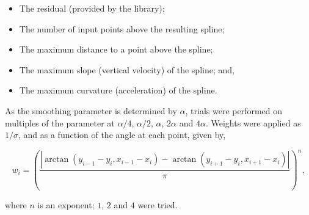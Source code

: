 \documentclass[doc]{apa6}
\begin{document}
\begin{itemize}
\item The residual (provided by the library);
\item The number of input points above the resulting spline;
\item The maximum distance to a point above the spline;
\item The maximum slope (vertical velocity) of the spline; and,
\item The maximum curvature (acceleration) of the spline.
\end{itemize}

As the smoothing parameter is determined by $\alpha$, trials were performed on multiples of the parameter at $\alpha/4$, $\alpha/2$, $\alpha$, $2\alpha$ and $4\alpha$. Weights were applied as $1/\sigma$, and as a function of the angle at each point, given by,

\begin{equation}
w_i = \left( \frac{ 
			|\arctan(y_{i-1}-y_{i}, x_{i-1}-x_{i}) - \arctan(y_{i+1}-y_{i},x_{i+1}-x_{i})|
		}{
			\pi
		}
	\right)^n,
\end{equation}

where $n$ is an exponent; $1$, $2$ and $4$ were tried.







\newpage

\printbibliography
\end{document}

